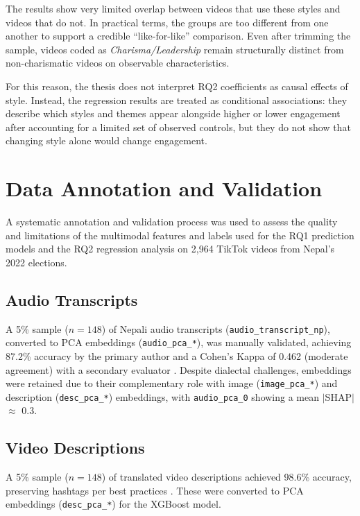 \documentclass[12pt,a4paper]{report}
\begin{document}
The results show very limited overlap between videos that use these styles and
videos that do not. In practical terms, the groups are too different from one
another to support a credible ``like-for-like'' comparison. Even after trimming
the sample, videos coded as \textit{Charisma/Leadership} remain structurally
distinct from non-charismatic videos on observable characteristics.

For this reason, the thesis does not interpret RQ2 coefficients as causal
effects of style. Instead, the regression results are treated as conditional
associations: they describe which styles and themes appear alongside higher or
lower engagement after accounting for a limited set of observed controls, but
they do not show that changing style alone would change engagement.
\section{Data Annotation and Validation}
\label{sec:data_annotation}

A systematic annotation and validation process was used to assess the quality and limitations of the multimodal features and labels used for the RQ1 prediction models and the RQ2 regression analysis on 2,964 TikTok videos from Nepal’s 2022 elections.

\subsection{Audio Transcripts}
A 5\% sample (\(n=148\)) of Nepali audio transcripts (\texttt{audio\_transcript\_np}), converted to PCA embeddings (\texttt{audio\_pca\_*}), was manually validated, achieving 87.2\% accuracy by the primary author and a Cohen’s Kappa of 0.462 (moderate agreement) with a secondary evaluator \parencite{landis1977measurement}. Despite dialectal challenges, embeddings were retained due to their complementary role with image (\texttt{image\_pca\_*}) and description (\texttt{desc\_pca\_*}) embeddings, with \texttt{audio\_pca\_0} showing a mean $|$SHAP$|$ $\approx$ 0.3.

\subsection{Video Descriptions}
A 5\% sample (\(n=148\)) of translated video descriptions achieved 98.6\% accuracy, preserving hashtags per best practices \parencite{highfield2016instagrammatics}. These were converted to PCA embeddings (\texttt{desc\_pca\_*}) for the XGBoost model.
\end{document}
